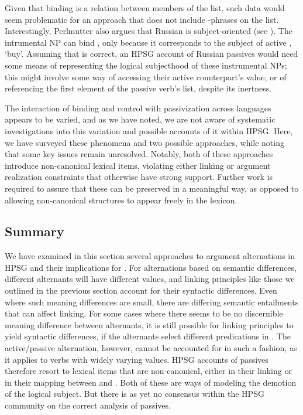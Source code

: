 \documentclass[output=paper
                ,modfonts
                ,nonflat
	        ,collection
	        ,collectionchapter
	        ,collectiontoclongg
 	        ,biblatex
                ,babelshorthands
                ,newtxmath
                ,draftmode
                ,colorlinks, citecolor=brown
]{./langsci/langscibook}
\begin{document}
Given that binding is a relation between members of the \argst list, such data would seem problematic for an approach that does not include -phrases on the \argst list.
Interestingly, Perlmutter also argues that Russian  is subject-oriented (see ).
The intrumental NP  can bind , only because it corresponds to the subject of active , `buy'.
Assuming that is correct, an HPSG account of Russian passives would need some means of representing the logical subjecthood of these instrumental NPs; this might involve some way of accessing their active counterpart's \subj value, or of referencing the first element of the passive verb's \argst list, despite its inertness.

The interaction of binding and control with passivization across languages appears to be varied, and as we have noted, we are not aware of systematic investigations into this variation and possible accounts of it within HPSG.
Here, we have surveyed these phenomena and two possible approaches, while noting that some key issues remain unresolved.
Notably, both of these approaches introduce non-canonical lexical items, violating either linking or argument realization constraints that otherwise have strong support. 
Further work is required to assure that these can be preserved in a meaningful way, as opposed to allowing non-canonical structures to appear freely in the lexicon.

\subsection{Summary}

We have examined in this section several approaches to argument alternations in HPSG and their implications for \argst.
For alternations based on semantic differences, different alternants will have different  values, and linking principles like those we outlined in the previous section account for their syntactic differences.
Even where such meaning differences are small, there are differing semantic entailments that can affect linking.
For some cases where there seems to be no discernible meaning difference between alternants, it is still possible for linking principles to yield syntactic differences, if the alternants select different  predications in .
The active/passive alternation, however, cannot be accounted for in such a fashion, as it applies to verbs with widely varying  values.
HPSG accounts of passives therefore resort to lexical items that are non-canonical, either in their linking or in their mapping between \argst and \val.
Both of these are ways of modeling the demotion of the logical subject.
But there is as yet no consensus within the HPSG community on the correct analysis of passives.
\end{document}
